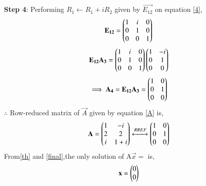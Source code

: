 \documentclass[journal,12pt,twocolumn]{IEEEtran}
\begin{document}
\textbf{Step 4}: Performing $R_1\leftarrow R_1+iR_2$ given by $\vec{E_{12}}$ on equation \eqref{4},
\begin{align}
\mathbf{E_{12}} = \begin{pmatrix}1&i&0\\0&1&0\\0&0&1\end{pmatrix}
\end{align}
\begin{align}
\mathbf{E_{12}A_3} =\begin{pmatrix}1&i&0\\0&1&0\\0&0&1\end{pmatrix} \begin{pmatrix}1&-i\\0&1\\0&0\end{pmatrix}
\end{align}
\begin{align}
\implies \mathbf{A_4} = \mathbf{E_{12}A_3} = \begin{pmatrix}1&0\\0&1\\0&0\end{pmatrix}\label{5}
\end{align}
$\therefore$ Row-reduced matrix of $\vec{A}$ given by equation \eqref{A} is,
\begin{align}
\mathbf{A} =  \begin{pmatrix}1&-i\\2&2\\i&1+i\end{pmatrix}\xleftrightarrow[]{RREF}\begin{pmatrix}1&0\\0&1\\0&0\end{pmatrix}\label{final}
\end{align}
From\eqref{th} and \eqref{final},the only solution of  A$\vec{x}=$ is,
\begin{align}
    \mathbf{x}=\begin{pmatrix}0 \\ 0\end{pmatrix}
\end{align}
\end{document}
